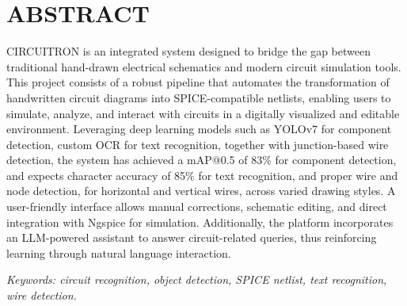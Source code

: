 

\chapter*{ABSTRACT}
{}


\bigskip
CIRCUITRON is an integrated system designed to bridge the gap between traditional 
hand-drawn electrical schematics and modern circuit simulation tools. This project 
consists of a robust pipeline that automates the transformation of handwritten circuit 
diagrams into SPICE-compatible netlists, enabling users to simulate, analyze, and 
interact with circuits in a digitally visualized and editable environment. Leveraging 
deep learning models such as YOLOv7 for component detection, custom OCR for text 
recognition, together with junction-based wire detection, the system has achieved a 
mAP@0.5 of 83\% for component detection, and expects character accuracy of 85\% for 
text recognition, and proper wire and node detection, for horizontal and vertical wires, 
across varied drawing styles. A user-friendly interface allows manual corrections, 
schematic editing, and direct integration with Ngspice for simulation. Additionally, the 
platform incorporates an LLM-powered assistant to answer circuit-related queries, thus 
reinforcing learning through natural language interaction.

\vspace{1em}
\noindent\textit{Keywords: circuit recognition, object detection, SPICE netlist, text recognition, wire detection.}
